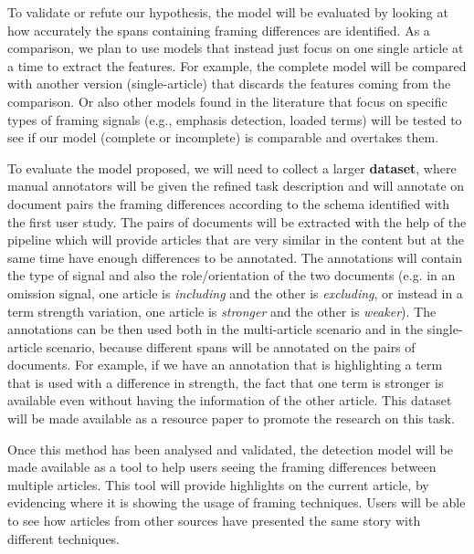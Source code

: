 To validate or refute our hypothesis, the model will be evaluated by looking at how accurately the spans containing framing differences are identified.
As a comparison, we plan to use models that instead just focus on one single article at a time to extract the features.
For example, the complete model will be compared with another version (single-article) that discards the features coming from the comparison.
Or also other models found in the literature that focus on specific types of framing signals (e.g., emphasis detection, loaded terms) will be tested to see if our model (complete or incomplete) is comparable and overtakes them.


To evaluate the model proposed, we will need to collect a larger \textbf{dataset}, where manual annotators will be given the refined task description and will annotate on document pairs the framing differences according to the schema identified with the first user study.
The pairs of documents will be extracted with the help of the pipeline which will provide articles that are very similar in the content but at the same time have enough differences to be annotated. %
The annotations will contain the type of signal and also the role/orientation of the two documents (e.g. in an omission signal, one article is \textit{including} and the other is \textit{excluding}, or instead in a term strength variation, one article is \textit{stronger} and the other is \textit{weaker}).
The annotations can be then used both in the multi-article scenario and in the single-article scenario, because different spans will be annotated on the pairs of documents.
For example, if we have an annotation that is highlighting a term that is used with a difference in strength, the fact that one term is stronger is available even without having the information of the other article.
This dataset will be made available as a resource paper to promote the research on this task.

Once this method has been analysed and validated, the detection model will be made available as a tool to help users seeing the framing differences between multiple articles.
This tool will provide highlights on the current article, by evidencing where it is showing the usage of framing techniques. Users will be able to see how articles from other sources have presented the same story with different techniques.

